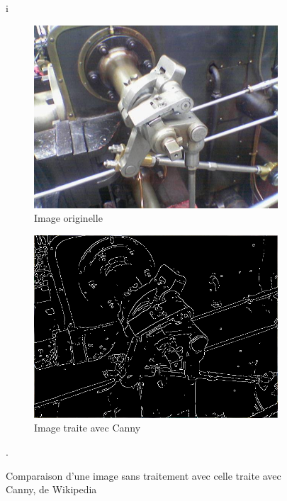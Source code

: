 \documentclass[a4paper, 12pt, titlepage, oneside]{article}
\begin{document}
	\begin{figure}[!h]i %
		\centering
		\begin{subfigure}[b]{0.4\linewidth}%
			\includegraphics[width=\linewidth]{ValveOriginal.png}
			\caption{Image originelle}
		\end{subfigure}
		\begin{subfigure}[b]{0.4\linewidth}
			\includegraphics[width=\linewidth]{ValveCanny.png}
			\caption{Image traite avec Canny}
		\end{subfigure}
		\caption{Comparaison d'une image sans traitement avec celle traite avec Canny, de Wikipedia \cite{WikiCannyOriginal}\cite{WikiCanny}}. 
		\label{fig:cannyGood}
	\end{figure}
\end{document}
